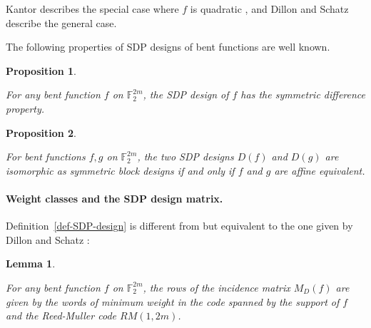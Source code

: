 \documentclass[12pt,a4paper]{article}
\newcommand{\mb}[1]{\mathbb{#1}}
\newcommand{\F}{\mb{F}}
\newtheorem{Lemma}{Lemma}
\newtheorem{Proposition}{Proposition}
\begin{document}
Kantor describes the special case where $f$ is quadratic
\cite[Section 5]{Kan75symplectic},
and Dillon and Schatz \cite{DilS87block} describe the general case.

The following properties of SDP designs of bent functions are well known.
\begin{Proposition}
\label{prop-SDP-design}
\cite[p. 160]{DilS87block} \cite[Theorem 3.29]{Neu06bent}

For any bent function $f$ on $\F_2^{2m}$, the SDP design of $f$ has the symmetric difference property.
\end{Proposition}

\begin{Proposition}
\label{prop-SDP-design-affine-equivalence}
\cite[p. 161]{DilS87block} \cite{Kan83exponential}

For bent functions $f, g$ on $\F_2^{2m}$,
the two SDP designs $D(f)$ and $D(g)$ are isomorphic as symmetric block designs
if and only if $f$ and $g$ are affine equivalent.
\end{Proposition}

%
%

\paragraph*{Weight classes and the SDP design matrix.}


Definition~\ref{def-SDP-design} is different from
but equivalent to the one given by Dillon and Schatz \cite[p. 160]{DilS87block}:
\begin{Lemma}
\label{lm-SDP-design-rows}
\cite[3.29]{Neu06bent}

For any bent function $f$ on $\F_2^{2m}$, the rows of the incidence matrix $M_D(f)$
are given by the words of minimum weight in the code spanned by the support of $f$ and the Reed-Muller code $RM(1,2m)$.
\end{Lemma}
\end{document}
